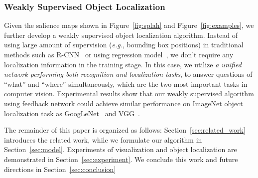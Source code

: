 \subsubsection*{Weakly Supervised Object Localization}
Given the salience maps shown in Figure~\ref{fig:splah} and Figure~\ref{fig:examples}, we further develop a weakly supervised object localization algorithm. Instead of using large amount of supervision (\emph{e.g.}, bounding box positions) in traditional methods such as R-CNN~\cite{girshick2014rich} or using regression model~\cite{erhan2014scalable}, we don't require any localization information in the training stage. In this case, we utilize \emph{a unified network performing both recognition and localization tasks}, to answer questions of ``what'' and ``where'' simultaneously, which are the two most important tasks in computer vision. Experimental results show that our weakly supervised algorithm using feedback network could achieve similar performance on ImageNet object localization task as GoogLeNet~\cite{Szegedy2014Going} and VGG~\cite{Simonyan2014Very}.

The remainder of this paper is organized as follows: Section~\ref{sec:related_work} introduces the related work, while we formulate our algorithm in Section~\ref{sec:model}. Experiments of visualization and object localization are demonstrated in Section~\ref{sec:experiment}. We conclude this work and future directions in Section~\ref{sec:conclusion}




